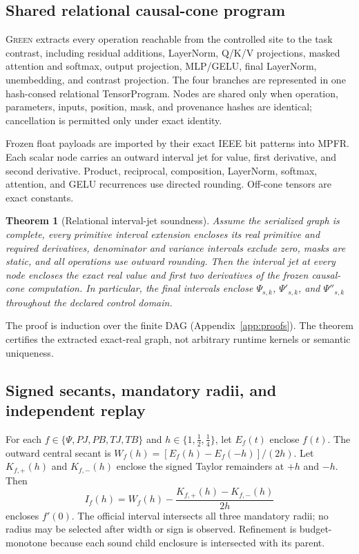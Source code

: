 \documentclass{article}
\newtheorem{theorem}{Theorem}
\newcommand{\green}{\textsc{Green}}
\begin{document}
\subsection{Shared relational causal-cone program}
\green{} extracts every operation reachable from the controlled site to the task contrast, including residual additions, LayerNorm, Q/K/V projections, masked attention and softmax, output projection, MLP/GELU, final LayerNorm, unembedding, and contrast projection. The four branches are represented in one hash-consed relational TensorProgram. Nodes are shared only when operation, parameters, inputs, position, mask, and provenance hashes are identical; cancellation is permitted only under exact identity.

Frozen float payloads are imported by their exact IEEE bit patterns into MPFR. Each scalar node carries an outward interval jet for value, first derivative, and second derivative. Product, reciprocal, composition, LayerNorm, softmax, attention, and GELU recurrences use directed rounding. Off-cone tensors are exact constants.

\begin{theorem}[Relational interval-jet soundness]
\label{thm:sound}
Assume the serialized graph is complete, every primitive interval extension encloses its real primitive and required derivatives, denominator and variance intervals exclude zero, masks are static, and all operations use outward rounding. Then the interval jet at every node encloses the exact real value and first two derivatives of the frozen causal-cone computation. In particular, the final intervals enclose $\Psi_{s,k}$, $\Psi'_{s,k}$, and $\Psi''_{s,k}$ throughout the declared control domain.
\end{theorem}
The proof is induction over the finite DAG (Appendix~\ref{app:proofs}). The theorem certifies the extracted exact-real graph, not arbitrary runtime kernels or semantic uniqueness.

\subsection{Signed secants, mandatory radii, and independent replay}
For each $f\in\{\Psi,PJ,PB,TJ,TB\}$ and $h\in\{1,\frac12,\frac14\}$, let $E_f(t)$ enclose $f(t)$. The outward central secant is $W_f(h)=[E_f(h)-E_f(-h)]/(2h)$. Let $K_{f,+}(h)$ and $K_{f,-}(h)$ enclose the signed Taylor remainders at $+h$ and $-h$. Then
\begin{equation}
    I_f(h)=W_f(h)-\frac{K_{f,+}(h)-K_{f,-}(h)}{2h}
    \label{eq:secant}
\end{equation}
encloses $f'(0)$. The official interval intersects all three mandatory radii; no radius may be selected after width or sign is observed. Refinement is budget-monotone because each sound child enclosure is intersected with its parent.
\end{document}
